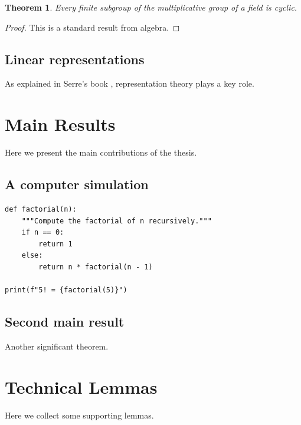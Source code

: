 \documentclass[12pt,reqno]{amsbook}
\newtheorem{theorem}{Theorem}[chapter]
\theoremstyle{definition}
\begin{document}
\begin{theorem}
Every finite subgroup of the multiplicative group of a field is cyclic.
\end{theorem}

\begin{proof}
This is a standard result from algebra.
\end{proof}

\section{Linear representations}
As explained in Serre's book \cite{serre}, representation theory plays a key role.

\chapter{Main Results}
Here we present the main contributions of the thesis.

\section{A computer simulation}

\begin{lstlisting}[basicstyle = \ttfamily\small,resetmargins=true,tabsize=5,extendedchars=false]
def factorial(n):
    """Compute the factorial of n recursively."""
    if n == 0:
        return 1
    else:
        return n * factorial(n - 1)

print(f"5! = {factorial(5)}")
\end{lstlisting}



\section{Second main result}
Another significant theorem.

\appendix
\chapter{Technical Lemmas}
Here we collect some supporting lemmas.

\end{document}

